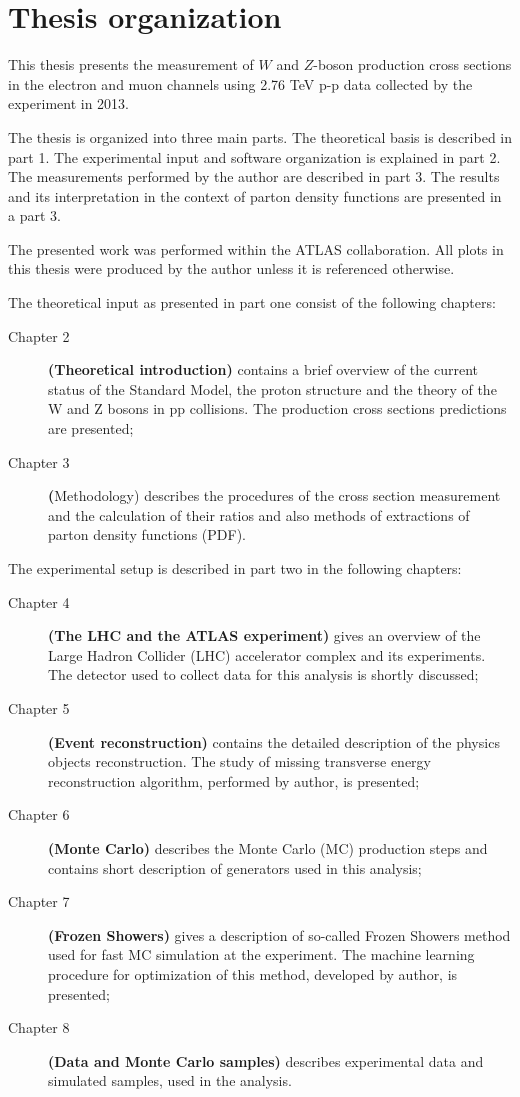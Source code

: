 \chapter{Thesis organization}
This thesis presents the measurement of $W$ and $Z$-boson production cross sections in  the electron and muon channels using 2.76 TeV  p-p data collected by the \atlas experiment in 2013.

The thesis is organized into three main parts. The theoretical basis is described in part 1. The experimental input and software organization is explained in part 2. The measurements performed by the author are described in part 3. The results and its interpretation in the context of parton density functions are presented in a part 3.

The  presented work was performed within the ATLAS collaboration. All plots in this thesis were produced by the author unless it is referenced otherwise. 

The theoretical input as presented in part one consist of the following chapters:
\begin{description}
\item [Chapter 2] \textbf{(Theoretical introduction)} contains a brief overview of the current status of the Standard Model, the proton structure and the theory of the W and Z bosons in pp collisions. The production cross sections predictions are presented;
\item [Chapter 3] \textbf({Methodology)} describes the procedures of the cross section measurement and the calculation of their ratios and also methods of extractions of parton density functions (PDF).
\end{description}

The experimental setup is described in part two in the following chapters:
\begin{description}
\item [Chapter 4] \textbf{(The LHC and the ATLAS experiment)} gives an overview of the Large Hadron Collider (LHC) accelerator complex and its experiments. The \atlas detector used to collect data for this analysis is shortly discussed;
\item [Chapter 5] \textbf{(Event reconstruction)} contains the detailed description of the physics objects reconstruction. The study of missing transverse energy reconstruction algorithm, performed by author, is presented;
\item [Chapter 6] \textbf{(Monte Carlo)} describes the Monte Carlo (MC) production steps and contains short description of generators used in this analysis;
\item [Chapter 7] \textbf{(Frozen Showers)} gives a description of so-called Frozen Showers method used for fast MC simulation at the \atlas experiment. The machine learning procedure for optimization of this method, developed by author, is presented;
\item [Chapter 8] \textbf{(Data and Monte Carlo samples)} describes experimental data and simulated samples, used in the analysis.
\end{description}

